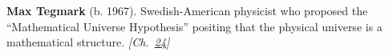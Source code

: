 \textbf{Max Tegmark} (b. 1967). Swedish-American physicist who proposed the ``Mathematical Universe Hypothesis'' positing that the physical universe is a mathematical structure. \emph{[Ch.~\hyperref[ch:4dspacetime]{24}]}

